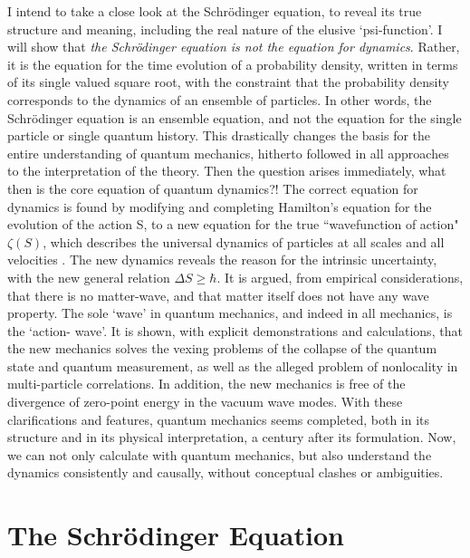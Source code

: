 I intend to take a close look at the Schr\"{o}dinger equation, to reveal its true structure
and meaning, including the real nature of the elusive `psi-function'. I will show that \textit{the
Schr\"{o}dinger equation is not the equation for dynamics}. Rather, it is the equation for the
time evolution of a probability density, written in terms of its single valued square root, with
the constraint that the probability density corresponds to the dynamics of an ensemble of
particles. In other words, the Schr\"{o}dinger equation is an ensemble equation, and not the
equation for the single particle or single quantum history. This drastically changes the basis
for the entire understanding of quantum mechanics, hitherto followed in all approaches
to the interpretation of the theory. Then the question arises immediately, what then is
the core equation of quantum dynamics?! The correct equation for dynamics is found by
modifying and completing Hamilton's equation for the evolution of the action S, to a new
equation for the true ``wavefunction of action" $\zeta(S)$, which describes the universal dynamics
of particles at all scales and all velocities \cite{chap27-key2}. The new dynamics reveals the reason for the
intrinsic uncertainty, with the new general relation $\Delta S \geq \hbar$. It is argued, from empirical
considerations, that there is no matter-wave, and that matter itself does not have any wave
property. The sole `wave' in quantum mechanics, and indeed in all mechanics, is the `action-
wave'. It is shown, with explicit demonstrations and calculations, that the new mechanics
solves the vexing problems of the collapse of the quantum state and quantum measurement,
as well as the alleged problem of nonlocality in multi-particle correlations. In addition, the
new mechanics is free of the divergence of zero-point energy in the vacuum wave modes.
With these clarifications and features, quantum mechanics seems completed, both in its
structure and in its physical interpretation, a century after its formulation. Now, we can
not only calculate with quantum mechanics, but also understand the dynamics consistently
and causally, without conceptual clashes or ambiguities.

\section{The Schr\"{o}dinger Equation}

